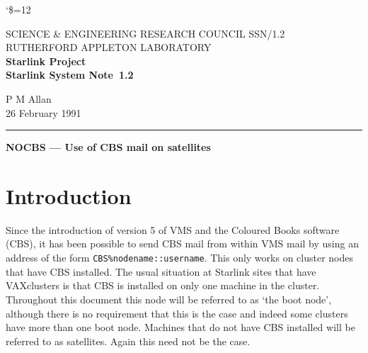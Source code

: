 \pagestyle{myheadings}

\newcommand{\stardoccategory}  {Starlink System Note}
\newcommand{\stardocinitials}  {SSN}
\newcommand{\stardocnumber}    {1.2}
\newcommand{\stardocauthors}   {P M Allan}
\newcommand{\stardocdate}      {26 February 1991}
\newcommand{\stardoctitle}     {NOCBS --- Use of CBS mail on satellites}

\newcommand{\stardocname}{\stardocinitials /\stardocnumber}
\markright{\stardocname}
\setlength{\textwidth}{160mm}
\setlength{\textheight}{240mm}
\setlength{\topmargin}{-5mm}
\setlength{\oddsidemargin}{0mm}
\setlength{\evensidemargin}{0mm}
\setlength{\parindent}{0mm}
\setlength{\parskip}{\medskipamount}
\setlength{\unitlength}{1mm}


\catcode`\$=12

\renewcommand{\_}{{\tt\char'137}}


\thispagestyle{empty}
SCIENCE \& ENGINEERING RESEARCH COUNCIL \hfill \stardocname\\
RUTHERFORD APPLETON LABORATORY\\
{\large\bf Starlink Project\\}
{\large\bf \stardoccategory\ \stardocnumber}
\begin{flushright}
\stardocauthors\\
\stardocdate
\end{flushright}
\vspace{-4mm}
\rule{\textwidth}{0.5mm}
\vspace{5mm}
\begin{center}
{\Large\bf \stardoctitle}
\end{center}
\vspace{5mm}

\section{Introduction}

Since the introduction of version 5 of VMS and the Coloured Books software
(CBS), it has been possible to send CBS mail from within VMS mail by using an
address of the form {\tt CBS\%nodename::username}. This only works
on cluster nodes that have CBS installed. The usual situation at Starlink sites
that have VAXclusters is that CBS is installed on only one machine in the
cluster. Throughout this document this node will be referred to as `the boot
node', although there is no requirement that this is the case and indeed some
clusters have more than one boot node. Machines that do not have CBS installed
will be referred to as satellites. Again this need not be the case.

